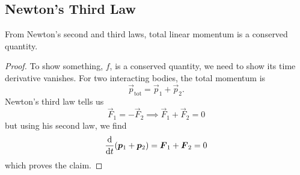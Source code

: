 \subsection{Newton's Third Law}
\begin{corollary}
From Newton's second and third laws, total linear momentum
is a conserved quantity.
\end{corollary}
\begin{proof}
To show something, $f$, is a conserved quantity, we
need to show its time derivative vanishes. For two interacting
bodies, the total momentum is
\begin{equation}
    \vec{p}_{\text{tot}} = \vec{p}_{1} + \vec{p}_{2}.
\end{equation}
Newton's third law tells us
\begin{equation}
    \vec{F}_{1}=-\vec{F}_{2}\implies\vec{F}_{1}+\vec{F}_{2}=0
\end{equation}
but using his second law, we find
\begin{equation}
    \frac{\D}{\D t}(\vec{p}_{1} + \vec{p}_{2}) =\vec{F}_{1}+\vec{F}_{2}=0
\end{equation}
which proves the claim.
\end{proof}
